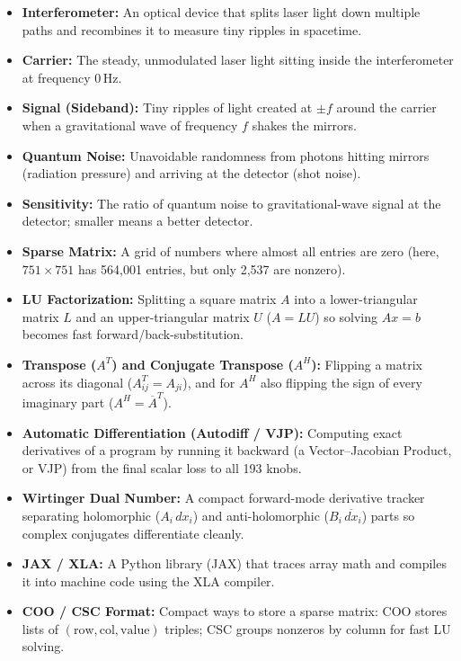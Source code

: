 \documentclass[11pt,a4paper]{article}
\begin{document}
\begin{itemize}[leftmargin=1.4em,itemsep=2pt]
    \item \textbf{Interferometer:} An optical device that splits laser light down multiple paths and recombines it to measure tiny ripples in spacetime.
    \item \textbf{Carrier:} The steady, unmodulated laser light sitting inside the interferometer at frequency $0\,\text{Hz}$.
    \item \textbf{Signal (Sideband):} Tiny ripples of light created at $\pm f$ around the carrier when a gravitational wave of frequency $f$ shakes the mirrors.
    \item \textbf{Quantum Noise:} Unavoidable randomness from photons hitting mirrors (radiation pressure) and arriving at the detector (shot noise).
    \item \textbf{Sensitivity:} The ratio of quantum noise to gravitational-wave signal at the detector; smaller means a better detector.
    \item \textbf{Sparse Matrix:} A grid of numbers where almost all entries are zero (here, $751\times 751$ has 564,001 entries, but only 2,537 are nonzero).
    \item \textbf{LU Factorization:} Splitting a square matrix $A$ into a lower-triangular matrix $L$ and an upper-triangular matrix $U$ ($A = LU$) so solving $Ax = b$ becomes fast forward/back-substitution.
    \item \textbf{Transpose ($A^T$) and Conjugate Transpose ($A^H$):} Flipping a matrix across its diagonal ($A^T_{ij} = A_{ji}$), and for $A^H$ also flipping the sign of every imaginary part ($A^H = \overline{A}^T$).
    \item \textbf{Automatic Differentiation (Autodiff / VJP):} Computing exact derivatives of a program by running it backward (a Vector--Jacobian Product, or VJP) from the final scalar loss to all 193 knobs.
    \item \textbf{Wirtinger Dual Number:} A compact forward-mode derivative tracker separating holomorphic ($A_i\,dx_i$) and anti-holomorphic ($B_i\,\overline{dx}_i$) parts so complex conjugates differentiate cleanly.
    \item \textbf{JAX / XLA:} A Python library (JAX) that traces array math and compiles it into machine code using the XLA compiler.
    \item \textbf{COO / CSC Format:} Compact ways to store a sparse matrix: COO stores lists of $(\text{row}, \text{col}, \text{value})$ triples; CSC groups nonzeros by column for fast LU solving.
\end{itemize}
\end{document}
